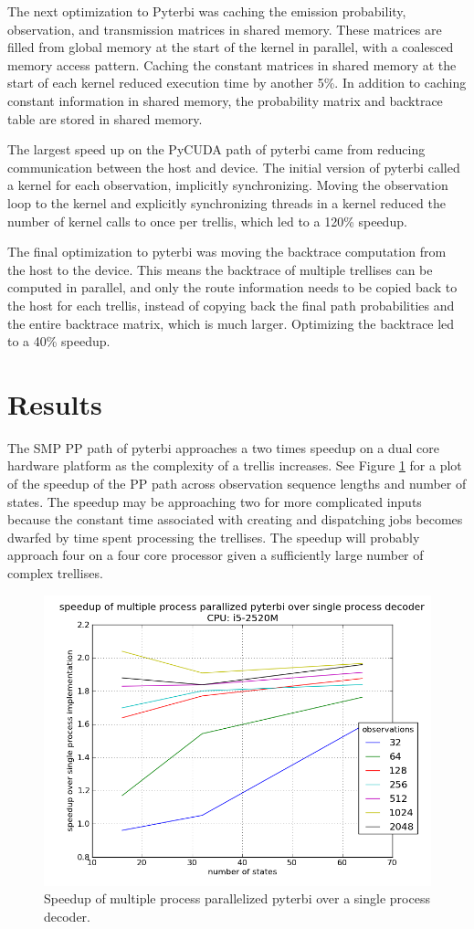 \documentclass[journal,onecolumn]{IEEEtran}
\begin{document}
The next optimization to Pyterbi was caching the emission probability, observation, and transmission matrices in shared memory. These matrices are filled from global memory at the start of the kernel in parallel, with a coalesced memory access pattern. Caching the constant matrices in shared memory at the start of each kernel reduced execution time by another 5\%. In addition to caching constant information in shared memory, the probability matrix and backtrace table are stored in shared memory.

The largest speed up on the PyCUDA path of pyterbi came from reducing communication between the host and device. The initial version of pyterbi called a kernel for each observation, implicitly synchronizing. Moving the observation loop to the kernel and explicitly synchronizing threads in a kernel reduced the number of kernel calls to once per trellis, which led to a 120\% speedup.

The final optimization to pyterbi was moving the backtrace computation from the host to the device. This means the backtrace of multiple trellises can be computed in parallel, and only the route information needs to be copied back to the host for each trellis, instead of copying back the final path probabilities and the entire backtrace matrix, which is much larger. Optimizing the backtrace led to a 40\% speedup.

\section{Results}
The SMP PP path of pyterbi approaches a two times speedup on a dual core hardware platform as the complexity of a trellis increases. See Figure \ref{fig_rhost} for a plot of the speedup of the PP path across observation sequence lengths and number of states. The speedup may be approaching two for more complicated inputs because the constant time associated with creating and dispatching jobs becomes dwarfed by time spent processing the trellises. The speedup will probably approach four on a four core processor given a sufficiently large number of complex trellises.

\begin{figure}[!t]
    \centering
    \includegraphics[width=.5 \linewidth]{figures/speedupgraphhost.png}
    \caption{Speedup of multiple process parallelized pyterbi over a single process decoder.}
    \label{fig_rhost}
\end{figure}
\end{document}

